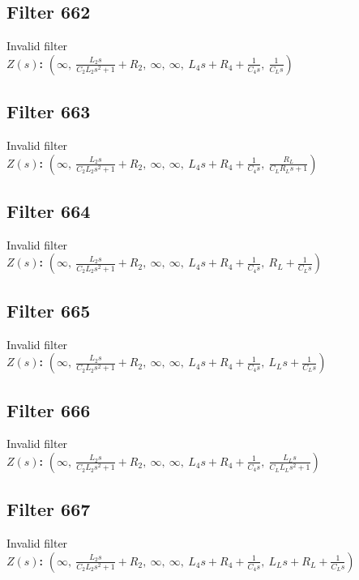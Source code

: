 \documentclass{article}
\begin{document}
\subsection*{Filter 662}
Invalid filter \\ 
\textbf{$Z(s)$:} $\left( \infty, \  \frac{L_{2} s}{C_{2} L_{2} s^{2} + 1} + R_{2}, \  \infty, \  \infty, \  L_{4} s + R_{4} + \frac{1}{C_{4} s}, \  \frac{1}{C_{L} s}\right)$ \\ 
\subsection*{Filter 663}
Invalid filter \\ 
\textbf{$Z(s)$:} $\left( \infty, \  \frac{L_{2} s}{C_{2} L_{2} s^{2} + 1} + R_{2}, \  \infty, \  \infty, \  L_{4} s + R_{4} + \frac{1}{C_{4} s}, \  \frac{R_{L}}{C_{L} R_{L} s + 1}\right)$ \\ 
\subsection*{Filter 664}
Invalid filter \\ 
\textbf{$Z(s)$:} $\left( \infty, \  \frac{L_{2} s}{C_{2} L_{2} s^{2} + 1} + R_{2}, \  \infty, \  \infty, \  L_{4} s + R_{4} + \frac{1}{C_{4} s}, \  R_{L} + \frac{1}{C_{L} s}\right)$ \\ 
\subsection*{Filter 665}
Invalid filter \\ 
\textbf{$Z(s)$:} $\left( \infty, \  \frac{L_{2} s}{C_{2} L_{2} s^{2} + 1} + R_{2}, \  \infty, \  \infty, \  L_{4} s + R_{4} + \frac{1}{C_{4} s}, \  L_{L} s + \frac{1}{C_{L} s}\right)$ \\ 
\subsection*{Filter 666}
Invalid filter \\ 
\textbf{$Z(s)$:} $\left( \infty, \  \frac{L_{2} s}{C_{2} L_{2} s^{2} + 1} + R_{2}, \  \infty, \  \infty, \  L_{4} s + R_{4} + \frac{1}{C_{4} s}, \  \frac{L_{L} s}{C_{L} L_{L} s^{2} + 1}\right)$ \\ 
\subsection*{Filter 667}
Invalid filter \\ 
\textbf{$Z(s)$:} $\left( \infty, \  \frac{L_{2} s}{C_{2} L_{2} s^{2} + 1} + R_{2}, \  \infty, \  \infty, \  L_{4} s + R_{4} + \frac{1}{C_{4} s}, \  L_{L} s + R_{L} + \frac{1}{C_{L} s}\right)$ \\ 
\end{document}
